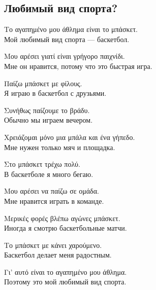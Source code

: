 \documentclass[12pt]{article}
\newcommand{\my}[1]{\textcolor{gray!80!white}{#1}}
\newenvironment{page}{\clearpage\normalsize\null\vfill}{\vfill\null}
\newenvironment{textblock}{\begin{minipage}{\textwidth}}{\end{minipage}\smallskip}
\begin{document}
	\begin{page}
		\subsection{Любимый вид спорта?}
		\small
		\begin{textblock}
			Το αγαπημένο μου άθλημα είναι το μπάσκετ.\\
			\my{Мой любимый вид спорта — баскетбол.}
			
			Μου αρέσει γιατί είναι γρήγορο παιχνίδι.\\
			\my{Мне он нравится, потому что это быстрая игра.}
			
			Παίζω μπάσκετ με φίλους.\\
			\my{Я играю в баскетбол с друзьями.}
			
			Συνήθως παίζουμε το βράδυ.\\
			\my{Обычно мы играем вечером.}
			
			Χρειάζομαι μόνο μια μπάλα και ένα γήπεδο.\\
			\my{Мне нужен только мяч и площадка.}
			
			Στο μπάσκετ τρέχω πολύ.\\
			\my{В баскетболе я много бегаю.}
			
			Μου αρέσει να παίζω σε ομάδα.\\
			\my{Мне нравится играть в команде.}
			
			Μερικές φορές βλέπω αγώνες μπάσκετ.\\
			\my{Иногда я смотрю баскетбольные матчи.}
			
			Το μπάσκετ με κάνει χαρούμενο.\\
			\my{Баскетбол делает меня радостным.}
			
			Γι’ αυτό είναι το αγαπημένο μου άθλημα.\\
			\my{Поэтому это мой любимый вид спорта.}
		\end{textblock}
	\end{page}
	
\end{document}
